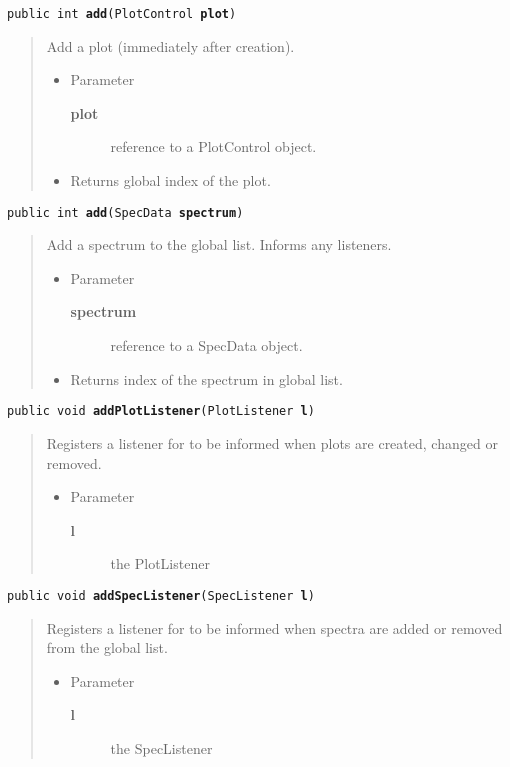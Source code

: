 \documentclass[twoside,11pt,nolof]{starlink}
\providecommand{\method}[1]{\texttt{#1}}
\newenvironment{desc}{\begin{quote}}{\end{quote}}
\begin{document}
\method{public int \textbf{add}(\texttt{PlotControl} \textbf{plot})\label{l263}\label{l264}}
\begin{desc}Add a plot (immediately after creation).
\begin{itemize}
\item{Parameter
  \begin{description}
   \item[\textbf{plot}]{reference to a PlotControl object.}
  \end{description}}
\end{itemize}
\begin{itemize}
\item{Returns global index of the plot. }
\end{itemize}
\end{desc}

\method{public int \textbf{add}(\texttt{SpecData} \textbf{spectrum})\label{l265}\label{l266}}
\begin{desc}Add a spectrum to the global list. Informs any listeners.
\begin{itemize}
\item{Parameter
  \begin{description}
   \item[\textbf{spectrum}]{reference to a SpecData object.}
  \end{description}}
\end{itemize}
\begin{itemize}
\item{Returns index of the spectrum in global list. }
\end{itemize}
\end{desc}

\method{public void \textbf{addPlotListener}(\texttt{PlotListener} \textbf{l})\label{l267}\label{l268}}
\begin{desc}Registers a listener for to be informed when plots are
  created, changed or removed.
\begin{itemize}
\item{Parameter
  \begin{description}
   \item[\textbf{l}]{the PlotListener}
  \end{description}}
\end{itemize}
\end{desc}

\method{public void \textbf{addSpecListener}(\texttt{SpecListener} \textbf{l})\label{l269}\label{l270}}
\begin{desc}Registers a listener for to be informed when spectra are added
  or removed from the global list.
\begin{itemize}
\item{Parameter
  \begin{description}
   \item[\textbf{l}]{the SpecListener}
  \end{description}}
\end{itemize}
\end{desc}
\end{document}
